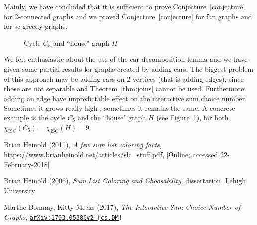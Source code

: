 \documentclass[11pt,a4paper]{article}
\theoremstyle{plain}
\theoremstyle{definition}
\theoremstyle{remark}
\newcommand{\iscn}{\chi_\text{ISC}}
\begin{document}
Mainly, we have concluded that it is sufficient to prove Conjecture~\ref{conjecture} for 2-connected graphs and we proved Conjecture~\ref{conjecture} for fan graphs and for sc-greedy graphs.


\begin{figure}[h]
\centering
\begin{subfigure}{.5\textwidth}
  \centering
  
\end{subfigure}%
\begin{subfigure}{.5\textwidth}
  \centering
  
\end{subfigure}

\caption{Cycle $C_5$ and “house" graph $H$}
\label{fig:houseg}
\end{figure}


We felt enthusiastic about the use of the ear decomposition lemma and we have given some partial results for graphs created by adding ears. The biggest problem of this approach may be adding ears on 2 vertices (that is adding edges), since those are not separable and Theorem~\ref{thm:joins} cannot be used. Furthermore adding an edge have unpredictable effect on the interactive sum choice number. Sometimes it grows really high \cite{iscn}, sometimes it remains the same. A concrete example is the cycle $C_5$ and the “house" graph $H$ (see Figure~\ref{fig:houseg}), for both $\iscn(C_5) = \iscn(H) = 9$. 



\begin{thebibliography}{99}
  Brian Heinold 
  (2011),
  \textit{A few sum list coloring facts},
  \url{https://www.brianheinold.net/articles/slc_stuff.pdf},
  [Online; accessed 22-February-2018]
  
  Brian Heinold
  (2006),
  \textit{Sum List Coloring and Choosability},
  dissertation,
  Lehigh University
  
  Marthe Bonamy, Kitty Meeks
  (2017),
  \textit{The Interactive Sum Choice Number of Graphs},
  {\tt \href{https://arxiv.org/abs/1703.05380v2}{arXiv:1703.05380v2 [cs.DM]}}

\end{thebibliography}
\end{document}
